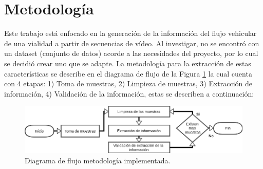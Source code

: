 \documentclass{llncs}
\begin{document}
\section{Metodología}
Este trabajo está enfocado en la generación de la información del flujo vehicular de una vialidad a partir de secuencias de vídeo. Al investigar, no se encontró con un dataset (conjunto de datos) acorde a las necesidades del proyecto, por lo cual se decidió crear uno que se adapte.
La metodología para la extracción de estas características se describe en el diagrama de flujo de la Figura \ref{img:FlowSystem} la cual cuenta con 4 etapas: 1) Toma de muestras, 2) Limpieza de muestras, 3) Extracción de información, 4) Validación de la información, estas se describen a continuación:  

\begin{figure}[H]
    \includegraphics[width=0.8
    \textwidth]{imgs/FlowSystem2.png}
    \centering
    \caption{Diagrama de flujo metodología implementada.}
    \label{img:FlowSystem}
\end{figure}
\end{document}
